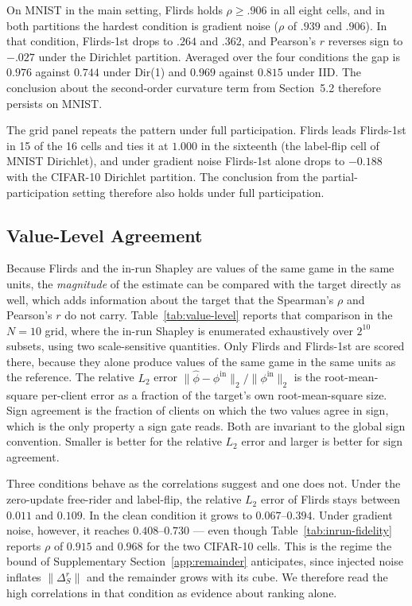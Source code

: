 \documentclass[letterpaper]{article} %
\theoremstyle{plain}
\begin{document}
On MNIST in the main setting, Flirds holds $\rho \ge .906$ in all eight cells,
and in both partitions the hardest condition is gradient noise ($\rho$ of
$.939$ and $.906$). In that condition, Flirds-1st drops to $.264$ and $.362$,
and Pearson's $r$ reverses sign to $-.027$ under the Dirichlet partition.
Averaged over the four conditions the gap is $0.976$ against $0.744$ under
Dir(1) and $0.969$ against $0.815$ under IID. The conclusion about the
second-order curvature term from Section~5.2 therefore persists on MNIST.

The grid panel repeats the pattern under full participation. Flirds leads
Flirds-1st in 15 of the 16 cells and ties it at $1.000$ in the sixteenth (the
label-flip cell of MNIST Dirichlet), and under gradient noise Flirds-1st
alone drops to $-0.188$ with the CIFAR-10 Dirichlet partition. The conclusion
from the partial-participation setting therefore also holds under full
participation.

\subsection{Value-Level Agreement}
\label{app:value-level}

Because Flirds and the in-run Shapley are values of the
same game in the same units, the \emph{magnitude} of the estimate can be
compared with the target directly as well, which adds information about the
target that the Spearman's $\rho$ and Pearson's $r$ do not carry.
Table~\ref{tab:value-level} reports that comparison in the $N{=}10$ grid,
where the in-run Shapley is enumerated exhaustively over $2^{10}$ subsets,
using two scale-sensitive quantities. Only Flirds and Flirds-1st are scored
there, because they alone produce values of the same game in the same units as
the reference. The relative $L_2$ error
$\|\hat\phi - \phi^{\mathrm{in}}\|_2 / \|\phi^{\mathrm{in}}\|_2$ is the
root-mean-square per-client error as a fraction of the target's own
root-mean-square size. Sign agreement is the fraction of clients on which the
two values agree in sign, which is the only property a sign gate reads.
Both are invariant to the global sign convention. Smaller is better for the
relative $L_2$ error and larger is better for sign agreement.

Three conditions behave as the correlations suggest and one does not. Under
the zero-update free-rider and label-flip, the relative $L_2$ error of
Flirds stays between $0.011$ and $0.109$. In the clean condition it grows to
$0.067$--$0.394$. Under gradient noise, however, it reaches
$0.408$--$0.730$ --- even though Table~\ref{tab:inrun-fidelity} reports
$\rho$ of $0.915$ and $0.968$ for the two CIFAR-10 cells. This is the regime
the bound of Supplementary Section~\ref{app:remainder} anticipates, since
injected noise inflates $\|\Delta_S^r\|$ and the remainder grows with its
cube. We therefore read the high correlations in that condition as evidence
about ranking alone.
\end{document}
